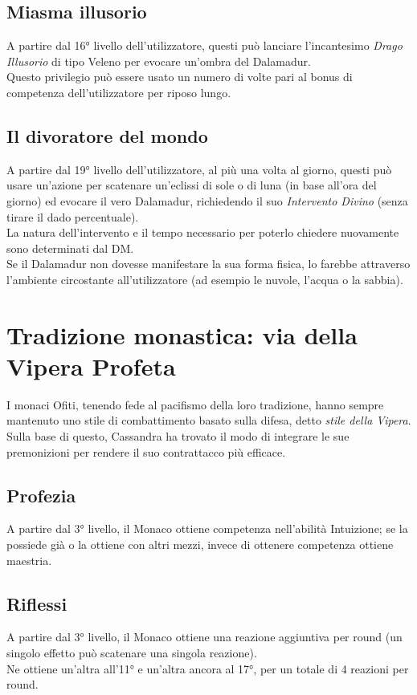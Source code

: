 \documentclass[letterpaper,twocolumn,openany,nodeprecatedcode]{dndbook}
\begin{document}
\subsection{Miasma illusorio}
A partire dal 16° livello dell'utilizzatore, questi può lanciare l'incantesimo \textit{Drago Illusorio} di tipo Veleno per evocare un'ombra del Dalamadur.\\
Questo privilegio può essere usato un numero di volte pari al bonus di competenza dell'utilizzatore per riposo lungo.

\subsection{Il divoratore del mondo}
A partire dal 19° livello dell'utilizzatore, al più una volta al giorno, questi può usare un'azione per scatenare un'eclissi di sole o di luna (in base all'ora del giorno) ed evocare il vero Dalamadur, richiedendo il suo \textit{Intervento Divino} (senza tirare il dado percentuale).\\
La natura dell'intervento e il tempo necessario per poterlo chiedere nuovamente sono determinati dal DM.\\
Se il Dalamadur non dovesse manifestare la sua forma fisica, lo farebbe attraverso l'ambiente circostante all'utilizzatore (ad esempio le nuvole, l'acqua o la sabbia).

\section{Tradizione monastica: via della Vipera Profeta}

I monaci Ofiti, tenendo fede al pacifismo della loro tradizione, hanno sempre mantenuto uno stile di combattimento basato sulla difesa, detto \textit{stile della Vipera}. Sulla base di questo, Cassandra ha trovato il modo di integrare le sue premonizioni per rendere il suo contrattacco più efficace.

\subsection{Profezia}
A partire dal 3° livello, il Monaco ottiene competenza nell'abilità Intuizione; se la possiede già o la ottiene con altri mezzi, invece di ottenere competenza ottiene maestria.

\subsection{Riflessi}
A partire dal 3° livello, il Monaco ottiene una reazione aggiuntiva per round (un singolo effetto può scatenare una singola reazione).\\
Ne ottiene un'altra all'11° e un'altra ancora al 17°, per un totale di 4 reazioni per round.
\end{document}
